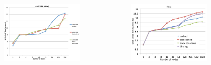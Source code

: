 \documentclass[serif,mathserif,final]{beamer}
\begin{document}
\begin{frame}{}
\begin{columns}[t]
\begin{column}{0.28\linewidth}
\begin{block}{}
\begin{columns}[t]
\begin{column}{0.98\columnwidth}
        \begin{columns}
          \begin{column}{0.07\columnwidth}
          \end{column}\begin{column}{0.07\columnwidth}
            \vspace{1ex}
            \begin{figure}[htb]
            \centering
            \includegraphics[width=1\columnwidth]{images/AMG-atlas-scaling}
            \end{figure}
          \end{column}\begin{column}{0.07\columnwidth}
            \begin{figure}[htb]
            \centering
            \includegraphics[width=1\columnwidth]{images/AMG-scaling-hera}

\end{figure}
\end{column}
\end{columns}
\end{column}
\end{columns}
\end{block}
\end{column}
\end{columns}
\end{frame}
\end{document}
